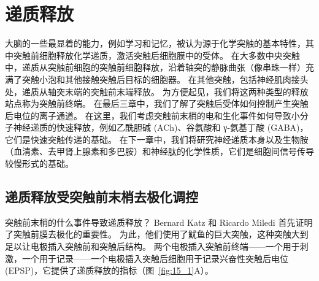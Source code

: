 \chapter{递质释放} \label{chap:chap15}

大脑的一些最显着的能力，例如学习和记忆，被认为源于化学突触的基本特性，其中突触前细胞释放化学递质，激活突触后细胞膜中的受体。
在大多数中央突触中，递质从突触前细胞的突触前细胞释放，沿着轴突的静脉曲张（像串珠一样）充满了突触小泡和其他接触突触后目标的细胞器。
在其他突触，包括神经肌肉接头处，递质从轴突末端的突触前末端释放。
为方便起见，我们将这两种类型的释放站点称为突触前终端。
在最后三章中，我们了解了突触后受体如何控制产生突触后电位的离子通道。
在这里，我们考虑突触前末梢的电和生化事件如何导致小分子神经递质的快速释放，例如乙酰胆碱 (ACh)、谷氨酸和 γ-氨基丁酸 (GABA)，它们是快速突触传递的基础。
在下一章中，我们将研究神经递质本身以及生物胺（血清素、去甲肾上腺素和多巴胺）和神经肽的化学性质，它们是细胞间信号传导较慢形式的基础。



\section{递质释放受突触前末梢去极化调控}

突触前末梢的什么事件导致递质释放？
Bernard Katz 和 Ricardo Miledi 首先证明了突触前膜去极化的重要性。
为此，他们使用了鱿鱼的巨大突触，这种突触大到足以让电极插入突触前和突触后结构。
两个电极插入突触前终端——一个用于刺激，一个用于记录——一个电极插入突触后细胞用于记录兴奋性突触后电位 (EPSP)，它提供了递质释放的指标（图~\ref{fig:15_1}A）。


